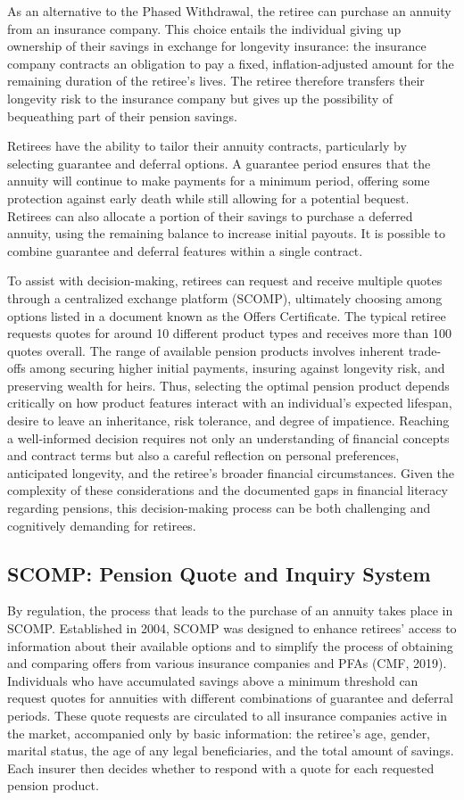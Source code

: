 \documentclass[12pt]{article}
\theoremstyle{plain}
\theoremstyle{plain}
\begin{document}
As an alternative to the Phased Withdrawal, the retiree can purchase an annuity from an insurance company. This choice entails the individual giving up ownership of their savings in exchange for longevity insurance: the insurance company contracts an obligation to pay a fixed, inflation-adjusted amount for the remaining duration of the retiree’s lives. The retiree therefore transfers their longevity risk to the insurance company but gives up the possibility of bequeathing part of their pension savings.

Retirees have the ability to tailor their annuity contracts, particularly by selecting guarantee and deferral options. A guarantee period ensures that the annuity will continue to make payments for a minimum period, offering some protection against early death while still allowing for a potential bequest. Retirees can also allocate a portion of their savings to purchase a deferred annuity, using the remaining balance to increase initial payouts. It is possible to combine guarantee and deferral features within a single contract.

To assist with decision-making, retirees can request and receive multiple quotes through a centralized exchange platform (SCOMP), ultimately choosing among options listed in a document known as the Offers Certificate. The typical retiree requests quotes for around 10 different product types and receives more than 100 quotes overall.
The range of available pension products involves inherent trade-offs among securing higher initial payments, insuring against longevity risk, and preserving wealth for heirs. Thus, selecting the optimal pension product depends critically on how product features interact with an individual's expected lifespan, desire to leave an inheritance, risk tolerance, and degree of impatience. Reaching a well-informed decision requires not only an understanding of financial concepts and contract terms but also a careful reflection on personal preferences, anticipated longevity, and the retiree’s broader financial circumstances. Given the complexity of these considerations and the documented gaps in financial literacy regarding pensions, this decision-making process can be both challenging and cognitively demanding for retirees.

\subsection*{SCOMP: Pension Quote and Inquiry System }
By regulation, the process that leads to the purchase of an annuity takes place in SCOMP.  Established in 2004, SCOMP was designed to enhance retirees' access to information about their available options and to simplify the process of obtaining and comparing offers from various insurance companies and PFAs (CMF, 2019). Individuals who have accumulated savings above a minimum threshold can request quotes for annuities with different combinations of guarantee and deferral periods. These quote requests are circulated to all insurance companies active in the market, accompanied only by basic information: the retiree’s age, gender, marital status, the age of any legal beneficiaries, and the total amount of savings. Each insurer then decides whether to respond with a quote for each requested pension product.
\end{document}
